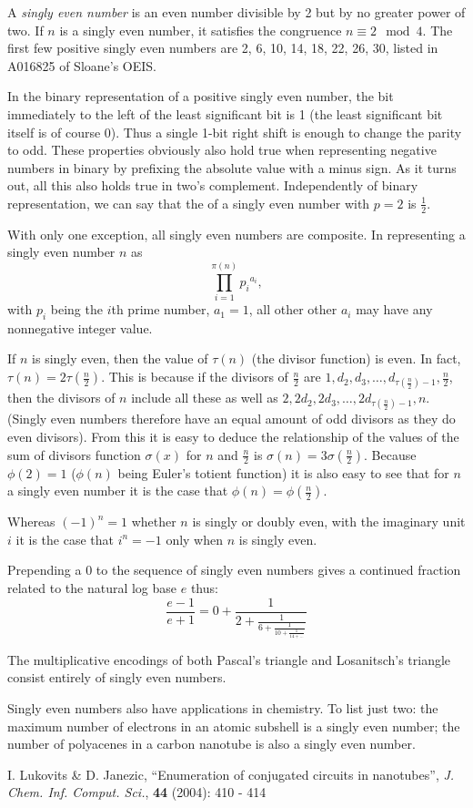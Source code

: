 \documentclass[12pt]{article}
\begin{document}
A {\em singly even number} is an even number divisible by 2 but by no greater power of two. If $n$ is a singly even number, it satisfies the congruence $n \equiv 2 \mod 4$. The first few positive singly even numbers are 2, 6, 10, 14, 18, 22, 26, 30, listed in A016825 of Sloane's OEIS.

In the binary representation of a positive singly even number, the bit immediately to the left of the least significant bit is 1 (the least significant bit itself is of course 0). Thus a single 1-bit right shift is enough to change the parity to odd. These properties obviously also hold true when representing negative numbers in binary by prefixing the absolute value with a minus sign. As it turns out, all this  also holds true in two's complement. Independently of binary representation, we can say that the  of a singly even number with $p = 2$ is $\frac{1}{2}$.

With only one exception, all singly even numbers are composite. In representing a singly even number $n$ as $$\prod_{i = 1}^{\pi(n)} {p_i}^{a_i},$$ with $p_i$ being the $i$th prime number, $a_1 = 1$, all other other $a_i$ may have any nonnegative integer value.

If $n$ is singly even, then the value of $\tau(n)$ (the divisor function) is even. In fact, $\tau(n) = 2\tau(\frac{n}{2})$. This is because if the divisors of $\frac{n}{2}$ are $1, d_2, d_3, \ldots , d_{\tau(\frac{n}{2}) - 1}, \frac{n}{2}$, then the divisors of $n$ include all these as well as $2, 2d_2, 2d_3, \ldots , 2d_{\tau(\frac{n}{2}) - 1}, n$. (Singly even numbers therefore have an equal amount of odd divisors as they do even divisors). From this it is easy to deduce the relationship of the values of the sum of divisors function $\sigma(x)$ for $n$ and $\frac{n}{2}$ is $\sigma(n) = 3\sigma(\frac{n}{2})$. Because $\phi(2) = 1$ ($\phi(n)$ being Euler's totient function) it is also easy to see that for $n$ a singly even number it is the case that $\phi(n) = \phi(\frac{n}{2})$.

Whereas $(-1)^n = 1$ whether $n$ is singly or doubly even, with the imaginary unit $i$ it is the case that $i^n = -1$ only when $n$ is singly even.

Prepending a 0 to the sequence of singly even numbers gives a continued fraction related to the natural log base $e$ thus: $$\frac{e - 1}{e + 1} = 0 + \frac{1}{2 + \frac{1}{6 + \frac{1}{10 + \frac{1}{14 + \ldots}}}}$$

The multiplicative encodings of both Pascal's triangle and Losanitsch's triangle consist entirely of singly even numbers.

Singly even numbers also have applications in chemistry. To list just two: the maximum number of electrons in an atomic subshell is a singly even number; the number of polyacenes in a carbon nanotube is also a singly even number. %

\begin{thebibliography}{1}
 I. Lukovits \& D. Janezic, ``Enumeration of conjugated circuits in nanotubes'', {\it J. Chem. Inf. Comput. Sci.}, {\bf 44} (2004): 410 - 414
\end{thebibliography}
\end{document}
